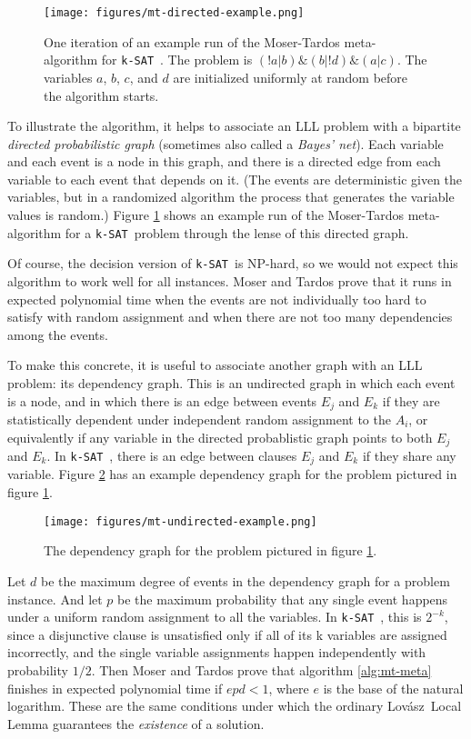 \documentclass[twocolumn]{article}
\newcommand{\ksat}{\texttt{k-SAT}~}
\newcommand{\lovasz}{Lov\'{a}sz~}
\begin{document}
\begin{figure}[ht]
  \texttt{[image: figures/mt-directed-example.png]}
  \caption{One iteration of an example run of the Moser-Tardos meta-algorithm for \ksat.  The problem is $(!a|b)\&(b|!d)\&(a|c)$.  The variables $a$, $b$, $c$, and $d$ are initialized uniformly at random before the algorithm starts.}
  \label{fig:mt-directed-example}
\end{figure}

To illustrate the algorithm, it helps to associate an LLL problem with a bipartite \emph{directed probabilistic graph} (sometimes also called a \emph{Bayes' net}).  Each variable and each event is a node in this graph, and there is a directed edge from each variable to each event that depends on it.  (The events are deterministic given the variables, but in a randomized algorithm the process that generates the variable values is random.)  Figure \ref{fig:mt-directed-example} shows an example run of the Moser-Tardos meta-algorithm for a \ksat problem through the lense of this directed graph.

Of course, the decision version of \ksat is NP-hard, so we would not expect this algorithm to work well for all instances.  Moser and Tardos \cite{moser2010constructive} prove that it runs in expected polynomial time when the events are not individually too hard to satisfy with random assignment and when there are not too many dependencies among the events.

To make this concrete, it is useful to associate another graph with an LLL problem: its dependency graph.  This is an undirected graph in which each event is a node, and in which there is an edge between events $E_j$ and $E_k$ if they are statistically dependent under independent random assignment to the $A_i$, or equivalently if any variable in the directed probablistic graph points to both $E_j$ and $E_k$.  In \ksat, there is an edge between clauses $E_j$ and $E_k$ if they share any variable.  Figure \ref{fig:mt-undirected-example} has an example dependency graph for the problem pictured in figure \ref{fig:mt-directed-example}.

\begin{figure}[ht]
  \texttt{[image: figures/mt-undirected-example.png]}
  \caption{The dependency graph for the problem pictured in figure \ref{fig:mt-directed-example}.}
  \label{fig:mt-undirected-example}
\end{figure}

Let $d$ be the maximum degree of events in the dependency graph for a problem instance.  And let $p$ be the maximum probability that any single event happens under a uniform random assignment to all the variables.  In \ksat, this is $2^{-k}$, since a disjunctive clause is unsatisfied only if all of its k variables are assigned incorrectly, and the single variable assignments happen independently with probability $1/2$.  Then Moser and Tardos prove that algorithm \ref{alg:mt-meta} finishes in expected polynomial time if $e p d < 1$, where $e$ is the base of the natural logarithm.  These are the same conditions under which the ordinary \lovasz Local Lemma guarantees the \emph{existence} of a solution.
\end{document}
